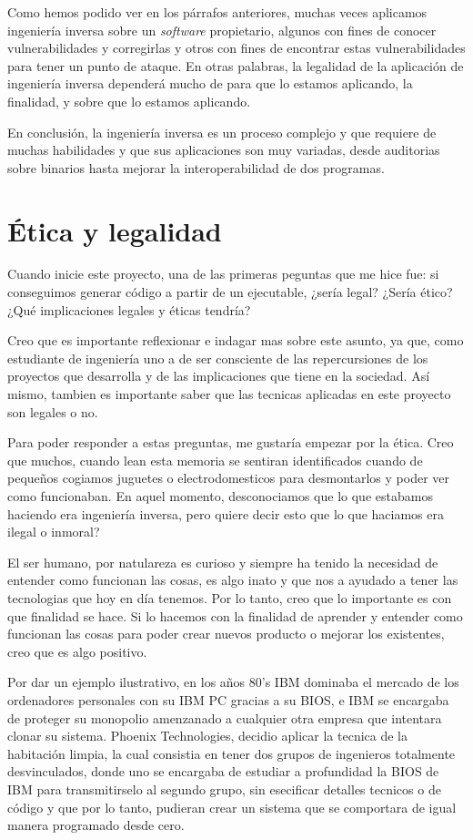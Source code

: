 Como hemos podido ver en los párrafos anteriores, muchas veces aplicamos ingeniería inversa sobre
un \textit{software} propietario, algunos con fines de conocer vulnerabilidades y corregirlas
y otros con fines de encontrar estas vulnerabilidades para tener un punto de ataque. En
otras palabras, la legalidad de la aplicación de ingeniería inversa dependerá mucho
de para que lo estamos aplicando, la finalidad, y sobre que lo estamos aplicando.

En conclusión, la ingeniería inversa es un proceso complejo y que requiere de muchas habilidades 
y que sus aplicaciones son muy variadas, desde auditorias sobre binarios hasta mejorar
la interoperabilidad de dos programas.

\section{Ética y legalidad}
\label{sec:etica_legalidad}

Cuando inicie este proyecto, una de las primeras peguntas que me hice fue: si conseguimos
generar código a partir de un ejecutable, ¿sería legal? ¿Sería ético? ¿Qué implicaciones
legales y éticas tendría?

Creo que es importante reflexionar e indagar mas sobre este asunto, ya que, como estudiante
de ingeniería uno a de ser consciente de las repercursiones de los proyectos que desarrolla y
de las implicaciones que tiene en la sociedad. Así mismo, tambien es importante saber que las
tecnicas aplicadas en este proyecto son legales o no.

Para poder responder a estas preguntas, me gustaría empezar por la ética. Creo que muchos, cuando
lean esta memoria se sentiran identificados cuando de pequeños cogiamos juguetes o electrodomesticos
para desmontarlos y poder ver como funcionaban. En aquel momento, desconociamos que lo que estabamos
haciendo era ingeniería inversa, pero quiere decir esto que lo que haciamos era ilegal o inmoral?

El ser humano, por natulareza es curioso y siempre ha tenido la necesidad de entender como funcionan
las cosas, es algo inato y que nos a ayudado a tener las tecnologias que hoy en día tenemos. Por lo tanto,
creo que lo importante es con que finalidad se hace. Si lo hacemos con la finalidad de aprender y entender
como funcionan las cosas para poder crear nuevos producto o mejorar los existentes, creo que es algo
positivo.

Por dar un ejemplo ilustrativo, en los años 80's IBM dominaba el mercado de los ordenadores personales
con su IBM PC gracias a su BIOS, e IBM se encargaba de proteger su monopolio amenzanado a cualquier otra
empresa que intentara clonar su sistema. Phoenix Technologies, decidio aplicar la tecnica de la habitación
limpia, la cual consistia en tener dos grupos de ingenieros totalmente desvinculados, donde uno se encargaba
de estudiar a profundidad la BIOS de IBM para transmitirselo al segundo grupo, sin esecificar detalles 
tecnicos o de código y que por lo tanto, pudieran crear un sistema que se comportara de igual manera programado
desde cero. \cite{IngenieriaInversa}

